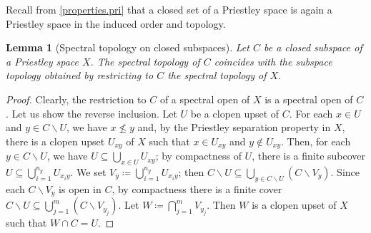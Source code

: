 \documentclass[12pt]{amsart}
\theoremstyle{plain}
\newtheorem{lemma}[theorem]{Lemma}
\theoremstyle{definition}
\begin{document}
Recall from \cref{properties.pri} that a closed set of a Priestley space is again a Priestley space in the induced order and topology.  


\begin{lemma}[Spectral topology on closed subspaces] \label{restriction.priest}
    Let $C$ be a closed subspace of a Priestley space $X$. The spectral topology of $C$ coincides with the subspace topology obtained by restricting to $C$ the spectral topology of $X$.
\end{lemma}

\begin{proof}
    Clearly, the restriction to $C$ of a spectral open of $X$ is a spectral open of $C$. Let us show the reverse inclusion. Let $U$ be a clopen upset of $C$. For each $x\in U$ and $y\in C\smallsetminus U$, we have $x\not\leq y$ and, by the Priestley separation property in $X$, there is a clopen upset $U_{xy}$ of $X$ such that $x\in U_{xy}$ and $y\not\in U_{xy}$. Then, for each $y\in C\smallsetminus U$, we have $U\subseteq \bigcup_{x\in U}U_{xy}$; by compactness of $U$, there is a finite subcover $U\subseteq \bigcup_{i=1}^{n_y}U_{x_i y}$. We set $V_y\coloneqq  \bigcup_{i=1}^{n_y}U_{x_i y}$; then  $C\smallsetminus U \subseteq\bigcup_{y\in C\smallsetminus U} (C\smallsetminus V_y)$. Since each $C\smallsetminus V_y$ is open in $C$, by compactness there is a finite cover $C\smallsetminus U \subseteq\bigcup_{j=1}^m (C\smallsetminus V_{y_{j}})$. Let $W\coloneqq \bigcap_{j=1}^{m} V_{y_{j}}$. Then $W$ is a clopen upset of $X$ such that $W\cap C= U$. 
\end{proof}
\end{document}
